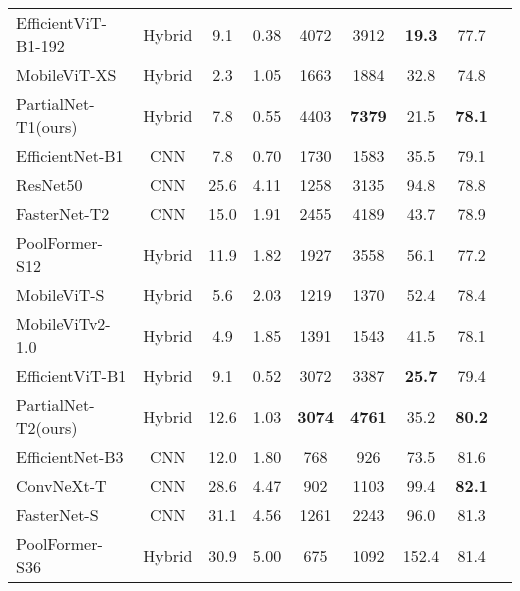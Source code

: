 \begin{table*}[ht]
{\begin{tabular}{@{}lcccccccc@{}}
    EfficientViT-B1-192\cite{Cai2023b}  & Hybrid          & 9.1              & 0.38  & 4072       & 3912        & {\bf 19.3}  & 77.7       \\
    MobileViT-XS\cite{Mehta2021}        & Hybrid          & 2.3              & 1.05  & 1663       & 1884        & 32.8        & 74.8       \\
    PartialNet-T1(ours)                 & Hybrid          & 7.8              & 0.55  & 4403       & {\bf 7379}  & 21.5        & {\bf 78.1} \\
    \hline
    EfficientNet-B1\cite{Tan2019}       & CNN             & 7.8              & 0.70  & 1730       & 1583        & 35.5        & 79.1       \\
    ResNet50\cite{He2015}               & CNN             & 25.6             & 4.11  & 1258       & 3135        & 94.8        & 78.8       \\
    FasterNet-T2\cite{Chen2023}         & CNN             & 15.0             & 1.91  & 2455       & 4189        & 43.7        & 78.9       \\
    PoolFormer-S12\cite{Yu2022a}        & Hybrid          & 11.9             & 1.82  & 1927       & 3558        & 56.1        & 77.2       \\
    MobileViT-S\cite{Mehta2021}         & Hybrid          & 5.6              & 2.03  & 1219       & 1370        & 52.4        & 78.4       \\
    MobileViTv2-1.0\cite{Mehta2022}     & Hybrid          & 4.9              & 1.85  & 1391       & 1543        & 41.5        & 78.1       \\
    EfficientViT-B1\cite{Cai2023b}      & Hybrid          & 9.1              & 0.52  & 3072       & 3387        & {\bf 25.7}  & 79.4       \\
    PartialNet-T2(ours)                 & Hybrid          & 12.6             & 1.03  & {\bf 3074} & {\bf 4761}  & 35.2        & {\bf 80.2} \\
    \hline
    EfficientNet-B3\cite{Tan2019}       & CNN             & 12.0             & 1.80  & 768        & 926         & 73.5        & 81.6       \\
    ConvNeXt-T\cite{Liu2022b}           & CNN             & 28.6             & 4.47  & 902        & 1103        & 99.4        & {\bf 82.1} \\
    FasterNet-S\cite{Chen2023}          & CNN             & 31.1             & 4.56  & 1261       & 2243        & 96.0        & 81.3       \\
    PoolFormer-S36\cite{Yu2022a}        & Hybrid          & 30.9             & 5.00  & 675        & 1092        & 152.4       & 81.4       \\

\end{tabular}}
\end{table*}
